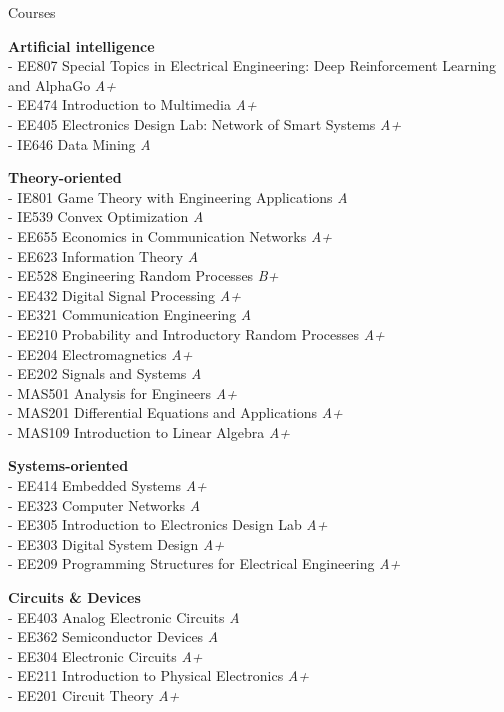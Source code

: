 \documentclass{resume} %
\begin{document}
\begin{rSection}{Courses}
	
\textbf{Artificial intelligence} 
\\ - EE807 Special Topics in Electrical Engineering: Deep Reinforcement Learning and AlphaGo
\hfill {\em A+}
\\ - EE474 Introduction to Multimedia
\hfill {\em A+}
\\ - EE405 Electronics Design Lab: Network of Smart Systems
\hfill {\em A+}
\\ - IE646 Data Mining
\hfill {\em A}


\textbf{Theory-oriented} 
\\ - IE801 Game Theory with Engineering Applications
\hfill {\em A}
\\ - IE539 Convex Optimization
\hfill {\em A}
\\ - EE655 Economics in Communication Networks
\hfill {\em A+}
\\ - EE623 Information Theory
\hfill {\em A}
\\ - EE528 Engineering Random Processes
\hfill {\em B+}
\\ - EE432 Digital Signal Processing
\hfill {\em A+}
\\ - EE321 Communication Engineering
\hfill {\em A}
\\ - EE210 Probability and Introductory Random Processes
\hfill {\em A+}
\\ - EE204 Electromagnetics
\hfill {\em A+}
\\ - EE202 Signals and Systems
\hfill {\em A}
\\ - MAS501 Analysis for Engineers
\hfill {\em A+}
\\ - MAS201 Differential Equations and Applications
\hfill {\em A+}
\\ - MAS109 Introduction to Linear Algebra 
\hfill {\em A+}

{\bf Systems-oriented}  
\\ - EE414 Embedded Systems
\hfill {\em A+}
\\ - EE323 Computer Networks
\hfill {\em A}
\\ - EE305 Introduction to Electronics Design Lab
\hfill {\em A+}
\\ - EE303 Digital System Design
\hfill {\em A+}
\\ - EE209 Programming Structures for Electrical Engineering
\hfill {\em A+}

\textbf{Circuits \& Devices}
\\ - EE403 Analog Electronic Circuits
\hfill {\em A}
\\ - EE362 Semiconductor Devices
\hfill {\em A}
\\ - EE304 Electronic Circuits
\hfill {\em A+}
\\ - EE211 Introduction to Physical Electronics
\hfill {\em A+}
\\ - EE201 Circuit Theory
\hfill {\em A+}

\end{rSection}
\end{document}
